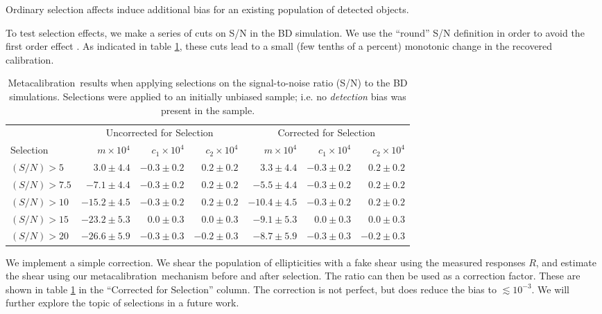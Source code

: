 \documentclass[usegraphicx,usenatbib]{mn2e}
\newcommand{\mcal}{metacalibration}
\newcommand{\Mcal}{Metacalibration}
\newcommand{\mcalR}{$R$}
\begin{document}
Ordinary selection affects induce additional bias for an existing population of
detected objects.

To test selection effects, we make a series of cuts on S/N in the BD
simulation.  We use the ``round'' S/N definition in order to avoid the first
order effect \citep{DESSVShear}. As indicated in table \ref{tab:selresults},
these cuts lead to a small (few tenths of a percent) monotonic change in the
recovered calibration.

\begin{table}
    \centering
    \caption{\Mcal\ results when applying selections on the signal-to-noise ratio (S/N) to the BD simulations. Selections
    were applied to an initially unbiased sample; i.e. no {\em detection}
    bias was present in the sample. \label{tab:selresults}}
    \begin{tabular}{ |l| r|r|r|  r|r|r|}
        \hline
        & \multicolumn{3}{c}{Uncorrected for Selection} & \multicolumn{3}{c}{Corrected for Selection} \\
        Selection & $m \times 10{^4} $ & $c_1 \times 10^4$ & $c_2 \times 10^4$ & $m \times 10^{4}$ & $c_1 \times 10^4$ & $c_2 \times 10^4$ \\
        \hline
        $(S/N) > 5$    & $3.0 \pm 4.4$ & $-0.3 \pm 0.2$ & $0.2 \pm 0.2$ & $3.3 \pm 4.4$ & $-0.3 \pm 0.2$ & $0.2 \pm 0.2$  \\
        $(S/N) > 7.5$  & $-7.1 \pm 4.4$ & $-0.3 \pm 0.2$ & $0.2 \pm 0.2$ & $-5.5 \pm 4.4$ & $-0.3 \pm 0.2$ & $0.2 \pm 0.2$  \\
        $(S/N) > 10$   & $-15.2 \pm 4.5$ & $-0.3 \pm 0.2$ & $0.2 \pm 0.2$ & $-10.4 \pm 4.5$ & $-0.3 \pm 0.2$ & $0.2 \pm 0.2$  \\
        $(S/N) > 15$   & $-23.2 \pm 5.3$ & $0.0 \pm 0.3$ & $0.0 \pm 0.3$ & $-9.1 \pm 5.3$ & $0.0 \pm 0.3$ & $0.0 \pm 0.3$  \\
        $(S/N) > 20$   & $-26.6 \pm 5.9$ & $-0.3 \pm 0.3$ & $-0.2\pm 0.3$ & $-8.7 \pm 5.9$ & $-0.3 \pm 0.3$ & $-0.2 \pm 0.3$  \\
    \end{tabular}
\end{table}

We implement a simple correction.  We shear the population of ellipticities
with a fake shear using the measured responses \mcalR, and estimate the shear
using our \mcal\ mechanism before and after selection.  The ratio can then be
used as a correction factor.  These are shown in table \ref{tab:selresults} in
the ``Corrected for Selection'' column.  The correction is not perfect, but
does reduce the bias to $\lesssim 10^{-3}$.  We will further explore the topic
of selections in a future work.
\end{document}
